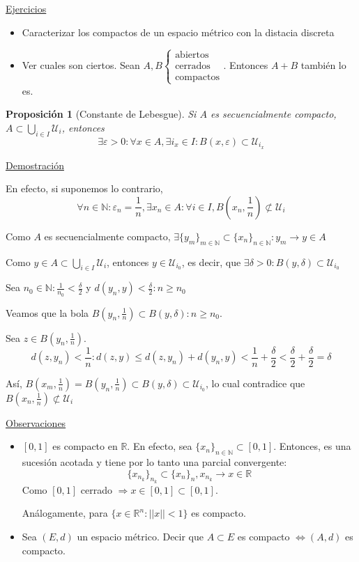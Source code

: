 \documentclass[10pt,a4paper,openright]{book}
\theoremstyle{break}
\newtheorem*{prop}{Proposición}
\begin{document}
\underline{Ejercicios}
\begin{itemize}
\item Caracterizar los compactos de un espacio métrico con la distacia discreta

\item Ver cuales son ciertos. Sean $A, B \begin{cases} \mbox{abiertos} \\ \mbox{cerrados} \\ \mbox{compactos} \end{cases}$. Entonces $A + B$ también lo es.
\end{itemize}

\begin{prop}[Constante de Lebesgue]
Si $A$ es secuencialmente compacto, $A \subset \bigcup_{i \in I} \mathcal{U}_i$, entonces
$$\exists \varepsilon > 0 : \forall x \in A, \exists i_x \in I : B(x, \varepsilon) \subset \mathcal{U}_{i_x}$$
\end{prop}

\underline{Demostración}

En efecto, si suponemos lo contrario, $$\forall n \in \mathbb{N} : \varepsilon_n = \frac{1}{n}, \exists x_n \in A : \forall i \in I, B(x_n, \frac{1}{n}) \not\subset \mathcal{U}_i$$

Como $A$ es secuencialmente compacto, $\exists \{y_m\}_{m \in \mathbb{N}} \subset \{ x_n\}_{n \in \mathbb{N}} : y_m \to y \in A$ 

Como $y \in A \subset \bigcup_{i \in I} \mathcal{U}_i$, entonces $y \in \mathcal{U}_{i_0}$, es decir, que $\exists \delta > 0 : B(y, \delta) \subset \mathcal{U}_{i_0}$

Sea $n_0 \in \mathbb{N} : \frac{1}{n_0} < \frac{\delta}{2}$ y $d(y_n, y)< \frac{\delta}{2} : n \geq n_0$

Veamos que la bola $B(y_n, \frac{1}{n}) \subset B(y,\delta) : n\geq n_0$.

Sea $z \in B(y_n, \frac{1}{n})$. 
$$d(z, y_n) < \frac{1}{n} : d(z,y) \leq d(z,y_n)+ d(y_n,y) < \frac{1}{n} + \frac{\delta}{2} < \frac{\delta}{2} + \frac{\delta}{2} = \delta$$

Así, $B(x_m, \frac{1}{n})=B(y_n,\frac{1}{n})\subset B(y,\delta) \subset \mathcal{U}_{i_0}$, lo cual contradice que$B(x_n, \frac{1}{n}) \not\subset \mathcal{U}_i$

\underline{Observaciones}
\begin{itemize}
\item $[0,1]$ es compacto en $\mathbb{R}$. En efecto, sea $\{x_n\}_{n \in \mathbb{N}} \subset [0,1]$. Entonces, es una sucesión acotada y tiene por lo tanto una parcial convergente: $$\{x_{n_k}\}_{n_k} \subset \{x_n\}_n, x_{n_k} \to x \in \mathbb{R}$$
Como $[0,1]$ cerrado $\Rightarrow x \in [0,1] \subset [0,1]$.

Análogamente, para $\{x \in \mathbb{R}^n : ||x|| < 1\}$ es compacto.

\item Sea $(E,d)$ un espacio métrico. Decir que $A \subset E$ es compacto $\Leftrightarrow (A,d)$ es compacto.

\end{itemize}
\end{document}

